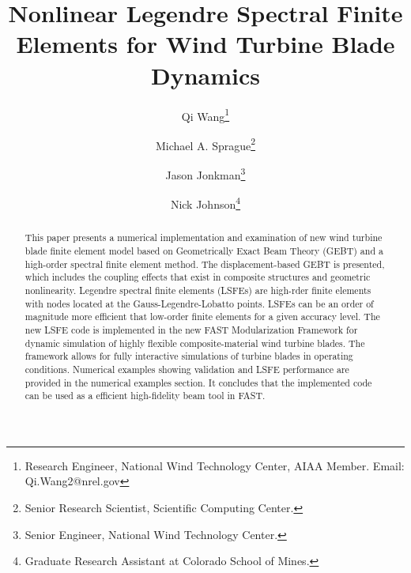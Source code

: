 \documentclass{aiaa-tc}
\title{Nonlinear Legendre Spectral Finite Elements for Wind Turbine Blade Dynamics}
\author[1]{Qi Wang\thanks{Research Engineer, National Wind Technology Center, AIAA Member. Email: Qi.Wang2@nrel.gov}}
\author[1]{Michael A. Sprague\thanks{Senior Research Scientist, Scientific Computing Center.}}
\author[1]{Jason Jonkman\thanks{Senior Engineer, National Wind Technology Center.}}
\author[2]{Nick Johnson\thanks{Graduate Research Assistant at Colorado School of Mines.}}
\affil[1]{National Renewable Energy Laboratory, Golden, CO 80401}
\affil[2]{Department of Mechanical Engineering, Colorado School of Mines, Golden, CO 80401}
\renewcommand{\kill}[1]{\textcolor{red}{\sout{#1}}}
\begin{document}
\maketitle

\begin{abstract}
This paper presents a numerical implementation and examination of new wind
turbine blade finite element model based on Geometrically Exact Beam Theory
(GEBT) and a high-order spectral finite element method.  The
displacement-based GEBT is presented, which includes the coupling effects
that exist in composite structures and geometric nonlinearity.   Legendre
spectral finite elements (LSFEs) are high-rder finite elements with nodes
located at the Gauss-Legendre-Lobatto points.  LSFEs can be an order of
magnitude more efficient that low-order finite elements for a given accuracy
level.    The new LSFE code is implemented in the new FAST Modularization Framework for
dynamic simulation of highly flexible composite-material wind turbine
blades.  The framework allows for fully interactive simulations of turbine
blades in operating conditions.  Numerical examples showing validation and
LSFE performance are provided in the numerical examples section. It concludes that the implemented code can be used as a efficient high-fidelity beam tool in FAST.
\end{abstract}






\end{document}

